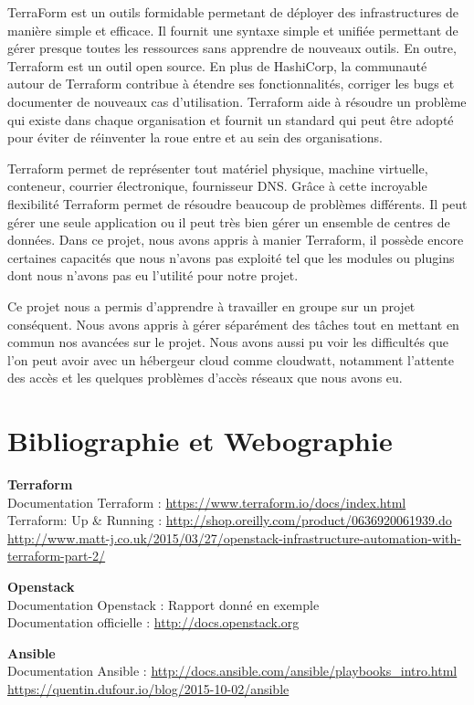 \documentclass[]{article}
\begin{document}
TerraForm est un outils formidable permetant de déployer des
infrastructures de manière simple et efficace. Il fournit une syntaxe
simple et unifiée permettant de gérer presque toutes les ressources sans
apprendre de nouveaux outils. En outre, Terraform est un outil open
source. En plus de HashiCorp, la communauté autour de Terraform
contribue à étendre ses fonctionnalités, corriger les bugs et documenter
de nouveaux cas d'utilisation. Terraform aide à résoudre un problème qui
existe dans chaque organisation et fournit un standard qui peut être
adopté pour éviter de réinventer la roue entre et au sein des
organisations.

Terraform permet de représenter tout matériel physique, machine virtuelle, conteneur, courrier électronique, fournisseur DNS. Grâce à cette incroyable flexibilité Terraform permet de résoudre beaucoup de problèmes différents. Il peut gérer une seule application ou il peut très bien gérer un ensemble de centres de données. Dans ce projet, nous avons appris à manier Terraform, il possède encore certaines capacités que nous n'avons pas exploité tel que les modules ou plugins dont nous n'avons pas eu l'utilité pour notre projet.

Ce projet nous a permis d'apprendre à travailler en groupe sur un projet conséquent. Nous avons appris à gérer séparément des tâches tout en mettant en commun nos avancées sur le projet. Nous avons aussi pu voir les difficultés que l'on peut avoir avec un hébergeur cloud comme cloudwatt, notamment l'attente des accès et les quelques problèmes d'accès réseaux que nous avons eu.

\newpage
\section*{Bibliographie et Webographie}
\textbf{Terraform}\\
Documentation Terraform : \url{https://www.terraform.io/docs/index.html} \\
Terraform: Up \& Running : \url{http://shop.oreilly.com/product/0636920061939.do } \\
\url{http://www.matt-j.co.uk/2015/03/27/openstack-infrastructure-automation-with-terraform-part-2/}

\textbf{Openstack}\\
Documentation Openstack : Rapport donné en exemple \\
Documentation officielle : \url{http://docs.openstack.org}

\textbf{Ansible}\\
Documentation Ansible : \url{http://docs.ansible.com/ansible/playbooks_intro.html}\\
\url{https://quentin.dufour.io/blog/2015-10-02/ansible}
\end{document}
